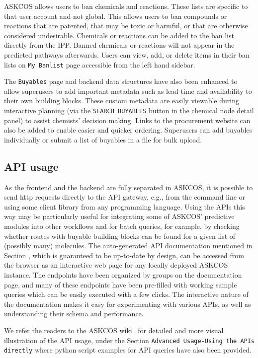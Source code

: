 \documentclass[pdflatex,sn-mathphys-num]{sn-jnl}%
\theoremstyle{thmstyleone}%
\theoremstyle{thmstyletwo}%
\theoremstyle{thmstylethree}%
\begin{document}
ASKCOS allows users to ban chemicals and reactions. These lists are specific to that user account and not global. This allows users to ban compounds or reactions that are patented, that may be toxic or harmful, or that are otherwise considered undesirable. Chemicals or reactions can be added to the ban list directly from the IPP. Banned chemicals or reactions will not appear in the predicted pathways afterwards. Users can view, add, or delete items in their ban lists on \texttt{My Banlist} page accessible from the left hand sidebar.

The \texttt{Buyables} page and backend data structures have also been enhanced to allow superusers to add important metadata such as lead time and availability to their own building blocks. These custom metadata are easily viewable during interactive planning (via the \texttt{SEARCH BUYABLES} button in the chemical node detail panel) to assist chemists' decision making. Links to the procurement website can also be added to enable easier and quicker ordering. Superusers can add buyables individually or submit a list of buyables in a file for bulk upload.

\subsection{API usage}\label{method_api_usage}

As the frontend and the backend are fully separated in ASKCOS, it is possible to send http requests directly to the API gateway, e.g., from the command line or using some client library from any programming language. Using the APIs this way may be particularly useful for integrating some of ASKCOS' predictive modules into other workflows and for batch queries, for example, by checking whether routes with buyable building blocks can be found for a given list of (possibly many) molecules. The auto-generated API documentation mentioned in Section , which is guaranteed to be up-to-date by design, can be accessed from the browser as an interactive web page for any locally deployed ASKCOS instance. The endpoints have been organized by groups on the documentation page, and many of these endpoints have been pre-filled with working sample queries which can be easily executed with a few clicks. The interactive nature of the documentation makes it easy for experimenting with various APIs, as well as understanding their schema and performance.

We refer the readers to the ASKCOS wiki~\citep{ASKCOSwiki} for detailed and more visual illustration of the API usage, under the Section \texttt{Advanced Usage-Using the APIs directly} where python script examples for API queries have also been provided.
\end{document}
